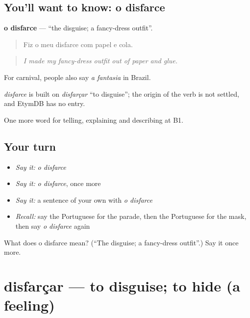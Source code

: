 \subsection*{You'll want to know: o disfarce}
\textbf{o disfarce} — \textquotedblleft{}the disguise; a fancy-dress outfit\textquotedblright{}.

\begin{quote}
Fiz o meu disfarce com papel e cola.
\end{quote}

\begin{quote}
\emph{I made my fancy-dress outfit out of paper and glue.}
\end{quote}

For carnival, people also say \emph{a fantasia} in Brazil.

\begin{cousinweb}
\emph{disfarce} is built on \emph{disfarçar} \textquotedblleft{}to disguise\textquotedblright{}; the origin of the verb is not settled, and EtymDB has no entry.
\end{cousinweb}

\begin{grammarlens}[title={What you've built}]
One more word for telling, explaining and describing at B1.
\end{grammarlens}

\subsection*{Your turn}
\begin{itemize}
\raggedright
  \item \emph{Say it:} \emph{o disfarce}
  \item \emph{Say it:} \emph{o disfarce}, once more
  \item \emph{Say it:} a sentence of your own with \emph{o disfarce}
  \item \emph{Recall:} say the Portuguese for the parade, then the Portuguese for the mask, then say \emph{o disfarce} again
\end{itemize}

\begin{tcolorbox}[breakable,colback=teal!4,colframe=teal!35!black,title={Before you move on}]
What does o disfarce mean? (\textquotedblleft{}The disguise; a fancy-dress outfit\textquotedblright{}.) Say it once more.
\end{tcolorbox}
\section[disfarçar]{disfarçar — to disguise; to hide (a feeling)}

